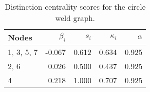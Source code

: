 \begin{table}
\centering
\caption{\label{tab:cw}Distinction centrality scores for the circle weld graph.}
\centering
\begin{tabular}[t]{lrrrr}
\toprule
Nodes & $\beta_i$ & $s_i$ & $\kappa_i$ & $\alpha$\\
\midrule
1, 3, 5, 7 & -0.067 & 0.612 & 0.634 & 0.925\\
2, 6 & 0.026 & 0.500 & 0.437 & 0.925\\
4 & 0.218 & 1.000 & 0.707 & 0.925\\
\bottomrule
\end{tabular}
\end{table}
